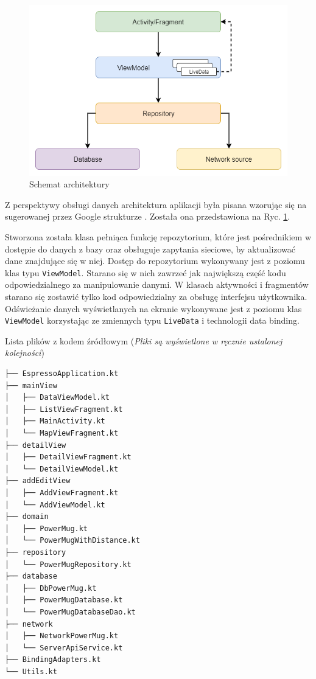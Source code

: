 \documentclass[polish,polish,a4paper,12pt]{article}
\begin{document}
		\begin{figure}[H]
			\centering
			\includegraphics[width = \textwidth]{architecture}
			\caption{Schemat architektury}
			\label{fig:architecture}
		\end{figure}

		Z perspektywy obsługi danych architektura aplikacji była pisana wzorując się na sugerowanej przez Google strukturze \cite{googlearch}\cite{kotlin}. Została ona przedstawiona na Ryc. \ref{fig:architecture}.

		Stworzona została klasa pełniąca funkcję repozytorium, które jest pośrednikiem w dostępie do danych z bazy oraz obsługuje zapytania sieciowe, by aktualizować dane znajdujące się w niej. Dostęp do repozytorium wykonywany jest z poziomu klas typu \texttt{ViewModel}. Starano się w nich zawrzeć jak największą część kodu odpowiedzialnego za manipulowanie danymi. W klasach aktywności i fragmentów starano się zostawić tylko kod odpowiedzialny za obsługę interfejsu użytkownika. Odświeżanie danych wyświetlanych na ekranie wykonywane jest z poziomu klas \texttt{ViewModel} korzystając ze zmiennych typu \texttt{LiveData} i technologii data binding.

		\begin{listing}[H]
			\caption{Lista plików z kodem źródłowym (\textit{Pliki są wyświetlone w ręcznie ustalonej kolejności})}
			\begin{verbatim}
├── EspressoApplication.kt
├── mainView
│   ├── DataViewModel.kt
│   ├── ListViewFragment.kt
│   ├── MainActivity.kt
│   └── MapViewFragment.kt
├── detailView
│   ├── DetailViewFragment.kt
│   └── DetailViewModel.kt
├── addEditView
│   ├── AddViewFragment.kt
│   └── AddViewModel.kt
├── domain
│   ├── PowerMug.kt
│   └── PowerMugWithDistance.kt
├── repository
│   └── PowerMugRepository.kt
├── database
│   ├── DbPowerMug.kt
│   ├── PowerMugDatabase.kt
│   └── PowerMugDatabaseDao.kt
├── network
│   ├── NetworkPowerMug.kt
│   └── ServerApiService.kt
├── BindingAdapters.kt
└── Utils.kt
			\end{verbatim}
			\label{listing:files}
		\end{listing}
\end{document}
